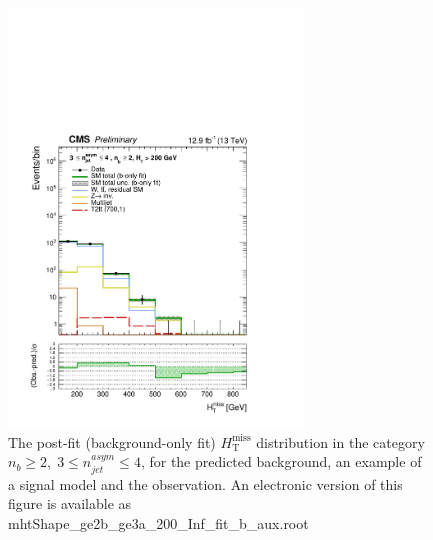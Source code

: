 \begin{figure}[tbhp]
    \caption{ 
    The post-fit (background-only fit) $H_{\mathrm{T}}^{\mathrm{miss}}$ distribution in the category $n_{b}\geq 2, \; 3 \leq n_{jet}^{asym} \leq 4$, 
    for the predicted background, an example of a signal model and the observation.
    An electronic version of this figure is available as mhtShape\_ge2b\_ge3a\_200\_Inf\_fit\_b\_aux.root
    \label{fig:mhtShape_ge2b_ge3a_fit_b} }
  \begin{center}
  \includegraphics[width=0.7\textwidth]{mhtShape_ge2b_ge3a_200_Inf_fit_b_aux}
  \end{center}
\end{figure}


